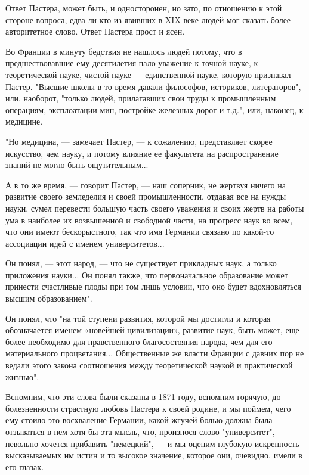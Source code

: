 Ответ Пастера,  может быть,  и односторонен, но  зато, по  отношению к
этой стороне  вопроса, едва  ли кто  из явивших в  XIX веке  людей мог
сказать более авторитетное слово. Ответ Пастера прост и ясен.

Во  Франции  в  минуту  бедствия   не  нашлось  людей  потому,  что  в
предшествовавшие  ему  десятилетия пало  уважение  к  точной науке,  к
теоретической  науке, чистой  науке  ---  единственной науке,  которую
признавал  Пастер.   "Высшие  школы  в  то   время  давали  философов,
историков,  литераторов", или,  наоборот,  "только людей,  прилагавших
свои  труды  к  промышленным операциям,  эксплоатации  мин,  постройке
железных дорог и т.д.", или, наконец, к медицине.

"Но  медицина,  --- замечает  Пастер,  ---  к сожалению,  представляет
скорее  искусство,  чем  науку,  и потому  влияние  ее  факультета  на
распространение знаний не могло быть ощутительным...

А в  то же  время, ---  говорит Пастер, ---  наш соперник,  не жертвуя
ничего на  развитие своего земледелия и  своей промышленности, отдавая
все на  нужды науки, сумел  перевести большую часть своего  уважения и
своих жертв на работы ума в наиболее их возвышенной и свободной части,
на прогресс  наук во всем,  что они  имеют бескорыстного, так  что имя
Германии связано по какой-то ассоциации идей с именем университетов...

Он  понял, ---  этот народ,  ---  что не  существует прикладных  наук,
а  только  приложения  науки...  Он понял  также,  что  первоначальное
образование может принести счастливые плоды  при том лишь условии, что
оно будет вдохновляться высшим образованием".

Он понял, что "на той ступени  развития, которой мы достигли и которая
обозначается именем «новейшей цивилизации», развитие наук, быть может,
еще более необходимо для  нравственного благосостояния народа, чем для
его  материального процветания...  Общественные  же  власти Франции  с
давних  пор не  ведали  этого закона  соотношения между  теоретической
наукой и практической жизнью".

Вспомним, что эти слова были сказаны в 1871 году, вспомним горячую, до
болезненности страстную  любовь Пастера к  своей родине, и  мы поймем,
чего ему  стоило это восхваление  Германии, какой жгучей  болью должна
была  отзываться  в  нем  хотя  бы эта  мысль,  что,  произнося  слово
"университет", невольно хочется прибавить  "немецкий", --- и мы оценим
глубокую  искренность высказываемых  им истин  и то  высокое значение,
которое они, очевидно, имели в его глазах.

